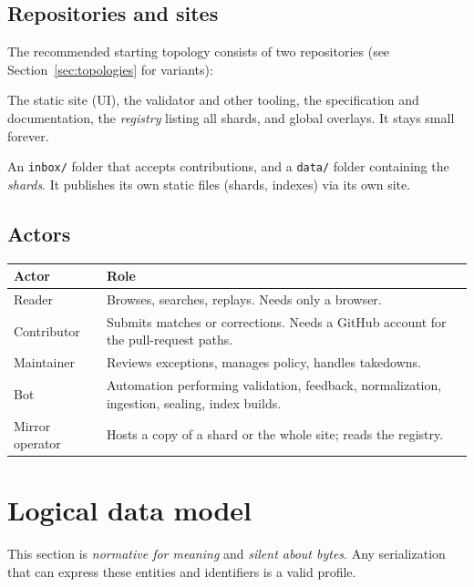 \documentclass[11pt,a4paper]{article}
\newcommand{\kw}[1]{\textit{#1}\index{#1}}
\begin{document}
\subsection{Repositories and sites}
The recommended starting topology consists of two repositories (see Section~\ref{sec:topologies} for variants):
\begin{description}[leftmargin=0.6cm]
  \item[Hub repository.] The static site (UI), the validator and other tooling, the specification and documentation, the \kw{registry} listing all shards, and global overlays. It stays small forever.
  \item[Data repository.] An \texttt{inbox/} folder that accepts contributions, and a \texttt{data/} folder containing the \kw{shards}. It publishes its own static files (shards, indexes) via its own site.
\end{description}

\subsection{Actors}
\begin{longtable}{@{}p{3cm}p{11.3cm}@{}}
\toprule
\textbf{Actor} & \textbf{Role}\\
\midrule
\endhead
Reader & Browses, searches, replays. Needs only a browser.\\
Contributor & Submits matches or corrections. Needs a GitHub account for the pull-request paths.\\
Maintainer & Reviews exceptions, manages policy, handles takedowns.\\
Bot & Automation performing validation, feedback, normalization, ingestion, sealing, index builds.\\
Mirror operator & Hosts a copy of a shard or the whole site; reads the registry.\\
\bottomrule
\end{longtable}

\section{Logical data model}\label{sec:logical}
This section is \emph{normative for meaning} and \emph{silent about bytes}. Any serialization that can express these entities and identifiers is a valid profile.
\end{document}
